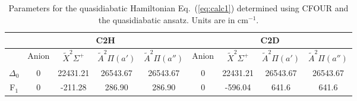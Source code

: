 \documentclass[journal=jpcafh,manuscript=article,layout=onecolumn, 12pt]{achemso}
\begin{document}
\begin{table}
	\caption{Parameters for the quasidiabatic Hamiltonian Eq.~(\ref{eq:calc1}) determined using CFOUR and the quasidiabatic ansatz. Units are in cm$^{-1}$.}
	\label{tab:1}
     \begin{tabular}{c | c c c c | c c c c} 
     	\hline
     	& \multicolumn{4}{c}{C2H} & \multicolumn{4}{c}{C2D}\\
     	\hline
     	& Anion & $\tilde{X}^2\Sigma^+$ & $\tilde{A}^2\Pi (a')$ & $\tilde{A}^2\Pi (a'')$ & Anion & $\tilde{X}^2\Sigma^+$ & $\tilde{A}^2\Pi (a')$ & $\tilde{A}^2\Pi (a'')$  \\
     	\hline
     	$\Delta_0$ & 0& 22431.21&  26543.67& 26543.67& 0 & 22431.21& 26543.67& 26543.67 \\
     	F$_1$ &  0& -211.28& 286.90& 286.90& 0& -596.04& 641.6& 641.6\\

\end{tabular}
\end{table}
\end{document}
